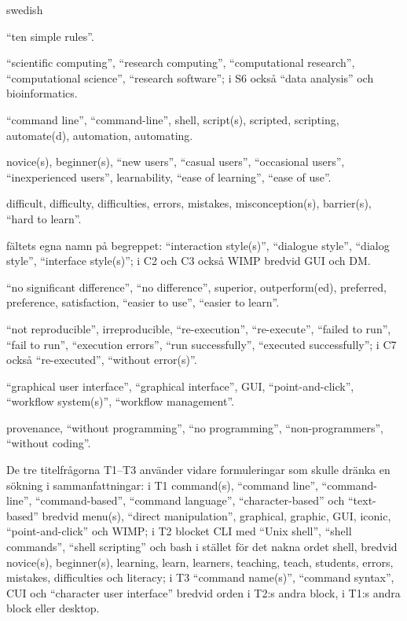 \begin{onlyin}{swedish}
\begin{description}
    \enquote{ten simple rules}.
  \item[RES] \enquote{scientific computing}, \enquote{research
    computing}, \enquote{computational research}, \enquote{computational
    science}, \enquote{research software}; i S6 också \enquote{data
    analysis} och bioinformatics.
  \item[AUT] \enquote{command line}, \enquote{command-line}, shell,
    script(s), scripted, scripting, automate(d), automation, automating.
  \item[NOV] novice(s), beginner(s), \enquote{new users},
    \enquote{casual users}, \enquote{occasional users},
    \enquote{inexperienced users}, learnability, \enquote{ease of
    learning}, \enquote{ease of use}.
  \item[DIF] difficult, difficulty, difficulties, errors, mistakes,
    misconception(s), barrier(s), \enquote{hard to learn}.
  \item[STYLE] fältets egna namn på begreppet:
    \enquote{interaction style(s)}, \enquote{dialogue style},
    \enquote{dialog style}, \enquote{interface style(s)}; i C2 och C3
    också WIMP bredvid GUI och DM.
  \item[NEG] \enquote{no significant difference}, \enquote{no
    difference}, superior, outperform(ed), preferred, preference,
    satisfaction, \enquote{easier to use}, \enquote{easier to learn}.
  \item[FAIL] \enquote{not reproducible}, irreproducible,
    \enquote{re-execution}, \enquote{re-execute}, \enquote{failed to
    run}, \enquote{fail to run}, \enquote{execution errors},
    \enquote{run successfully}, \enquote{executed successfully}; i C7
    också \enquote{re-executed}, \enquote{without error(s)}.
  \item[GREP] \enquote{graphical user interface}, \enquote{graphical
    interface}, GUI, \enquote{point-and-click}, \enquote{workflow
    system(s)}, \enquote{workflow management}.
  \item[PROV] provenance, \enquote{without programming}, \enquote{no
    programming}, \enquote{non-programmers}, \enquote{without coding}.
\end{description}
\par\endgroup
De tre titelfrågorna T1--T3 använder vidare formuleringar som skulle
dränka en sökning i sammanfattningar: i T1 command(s), \enquote{command
line}, \enquote{command-line}, \enquote{command-based}, \enquote{command
language}, \enquote{character-based} och \enquote{text-based} bredvid
menu(s), \enquote{direct manipulation}, graphical, graphic, GUI, iconic,
\enquote{point-and-click} och WIMP; i T2 blocket CLI med \enquote{Unix
shell}, \enquote{shell commands}, \enquote{shell scripting} och bash i
stället för det nakna ordet shell, bredvid novice(s), beginner(s),
learning, learn, learners, teaching, teach, students, errors, mistakes,
difficulties och literacy; i T3 \enquote{command name(s)},
\enquote{command syntax}, CUI och \enquote{character user interface}
bredvid orden i T2:s andra block, i T1:s andra block eller desktop.
\end{onlyin}

